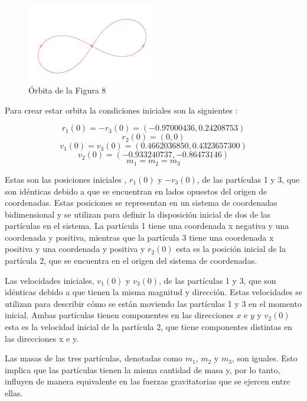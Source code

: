 \documentclass{article}
\begin{document}
\begin{figure}[h]
\centering
\includegraphics[width=0.5\textwidth]{img/orbit8.png}
\caption{Órbita de la Figura 8}
\end{figure}


Para crear estar orbita la condiciones iniciales son la siguientes \cite{atkinson2011numerical}: 

$$r_1(0) = -r_3(0) = (-0.97000436,0.24208753)$$
$$r_2(0) = (0,0)$$
$$v_1(0) = v_3(0) = (0.4662036850, 0.4323657300)$$
$$v_2(0) = (-0.933240737, -0.86473146)$$
$$m_1 = m_2 = m_3$$


Estas son las posiciones iniciales , $r_1(0)$ y $-r_3(0)$, de las 
partículas 1 y 3, que son idénticas debido a que se 
encuentran en lados opuestos del origen de coordenadas. 
Estas posiciones se representan en un sistema de coordenadas 
bidimensional y se utilizan para definir la disposición 
inicial de dos de las partículas en el sistema. La 
partícula 1 tiene una coordenada x negativa y una 
coordenada y positiva, mientras que la partícula 3 
tiene una coordenada x positiva y una coordenada y 
positiva y $r_2(0)$ esta es la posición inicial de la partícula 2, 
que se encuentra en el origen del sistema de coordenadas.

Las velocidades iniciales, $v_1(0)$ y $v_3(0)$, de las partículas 
1 y 3, que son idénticas debido a que tienen la misma magnitud y 
dirección. Estas velocidades se utilizan para describir 
cómo se están moviendo las partículas 1 y 3 en el momento 
inicial. Ambas partículas tienen componentes en las direcciones 
$x$ e $y$ y $v_2(0)$ esta es la velocidad inicial de la partícula 2, 
que tiene componentes distintas en las direcciones x e y.

Las masas de las tres partículas, denotadas como $m_1$, $m_2$ y $m_3$, 
son iguales. Esto implica que las partículas tienen la misma 
cantidad de masa y, por lo tanto, influyen de manera 
equivalente en las fuerzas gravitatorias que se ejercen entre ellas.

\end{document}
